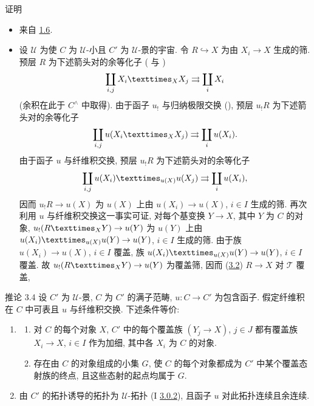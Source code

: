 \begin{enonce*}[remark]{证明}
\begin{itemize}
\item[i) $\Rightarrow$ ii):] 来自 \hyperref[III.prop1.6]{1.6}.

\item[ii) $\Rightarrow$ i):] 设 $𝒰$ 为使 $C$ 为 $𝒰$-小且 $C'$ 为 $𝒰$-景的宇宙.
令 $R\hookrightarrow X$ 为由 $X_i\rightarrow X$ 生成的筛.
预层 $R$ 为下述箭头对的余等化子
( 与 )
$$
\coprod_{i,j} \fprod{X_i}{X_j}{X}\rightrightarrows \coprod_i X_i
$$
(余积在此于 $C^{\wedge}$ 中取得).
由于函子 $u_{!}$ 与归纳极限交换 (),
预层 $u_{!}R$ 为下述箭头对的余等化子
$$
\coprod_{i,j}u(\fprod{X_i}{X_j}{X})\rightrightarrows \coprod_i
u(X_i){\quoi}.
$$
由于函子 $u$ 与纤维积交换, 预层 $u_{!}R$ 为下述箭头对的余等化子
$$
\coprod_{i,j}\fprod{u(X_i)}{u(X_j)}{u(X)}\rightrightarrows \coprod_i
u(X_i){\quoi},
$$
因而\pageoriginale{} $u_{!}R\rightarrow u(X)$ 为 $u(X)$ 上由
$u(X_i)\rightarrow u(X)$, $i\in I$ 生成的筛.
再次利用 $u$ 与纤维积交换这一事实可证, 对每个基变换
$Y\rightarrow X$, 其中 $Y$ 为 $C$ 的对象,
$u_{!}(\fprod{R}{Y}{X})\rightarrow u(Y)$ 为 $u(Y)$ 上由
$\fprod{u(X_i)}{u(Y)}{u(X)}\rightarrow u(Y)$, $i\in I$ 生成的筛.
由于族 $u(X_i)\rightarrow u(X)$, $i\in I$ 覆盖,
族 $\fprod{u(X_i)}{u(Y)}{u(X)}\rightarrow u(Y)$, $i\in I$ 覆盖.
故 $u_{!}(\fprod{R}{Y}{X})\rightarrow u(Y)$ 为覆盖筛,
因而 (\hyperref[III.prop3.2]{3.2}) $R\rightarrow X$ 对 $𝒯$ 覆盖, \cqfd
\end{itemize}
\end{enonce*}

\begin{enonce*}{推论 3.4}
设 $C'$ 为 $𝒰$-景, $C$ 为 $C'$ 的满子范畴, $u:C\rightarrow C'$ 为包含函子.
假定纤维积在 $C$ 中可表且 $u$ 与纤维积交换. 下述条件等价:
\begin{enumerate}
\renewcommand{\theenumi}{\roman{enumi}}
\renewcommand{\labelenumi}{\theenumi)}
\item
\begin{enumerate}
\renewcommand{\theenumii}{\alph{enumii}}
\renewcommand{\labelenumii}{\theenumii)}
\item 对 $C$ 的每个对象 $X$, $C'$ 中的每个覆盖族
$(Y_j\rightarrow X)$, $j\in J$ 都有覆盖族 $X_i\rightarrow X$, $i\in I$ 作为加细,
其中各 $X_i$ 为 $C$ 的对象.

\item 存在由 $C$ 的对象组成的小集 $G$, 使 $C$ 的每个对象都成为
$C'$ 中某个覆盖态射族的终点, 且这些态射的起点均属于 $G$.
\end{enumerate}

\item 由 $C'$ 的拓扑诱导的拓扑为 $𝒰$-拓扑
{\rm (I \hyperref[II.def3.0.2]{3.0.2})}, 且函子 $u$ 对此拓扑连续且余连续.
\end{enumerate}
\end{enonce*}

